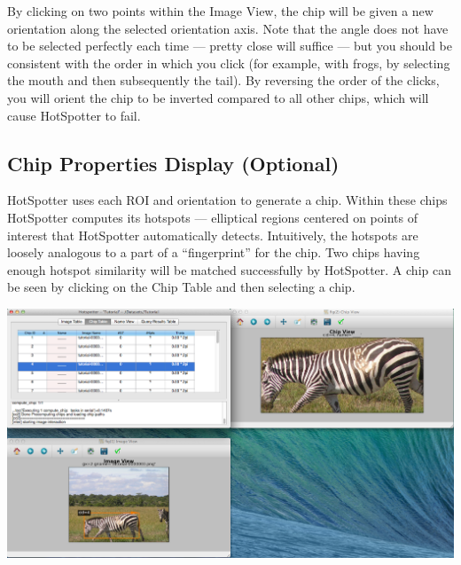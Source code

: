 \documentclass[a4paper,10pt]{article}
\begin{document}
        \noindent
        By clicking on two points within the Image View, the chip will be given a new orientation along the selected
       orientation axis.  Note that the angle does not have to be
        selected perfectly each time --- pretty close will suffice ---
        but you should be consistent with the order in which you
        click (for example, with frogs, by selecting the mouth and then subsequently the tail).  By reversing the order
	of the clicks, you will orient the chip to be inverted compared to all other chips, which will cause HotSpotter to fail.

    \subsection{Chip Properties Display (Optional)} 
        HotSpotter uses each ROI and orientation to generate a chip. 
        Within these chips HotSpotter computes its hotspots --- elliptical
        regions centered on points of interest that HotSpotter automatically
        detects.  Intuitively, the hotspots are loosely analogous to a
        part of a ``fingerprint'' for the chip.  Two chips having enough hotspot similarity
        will be matched successfully by HotSpotter. A chip can be seen by clicking 
	on the Chip Table and then selecting a chip.

        \begin{center}
          \includegraphics[scale=0.2]{images/chip.png}
        \end{center}
\end{document}

